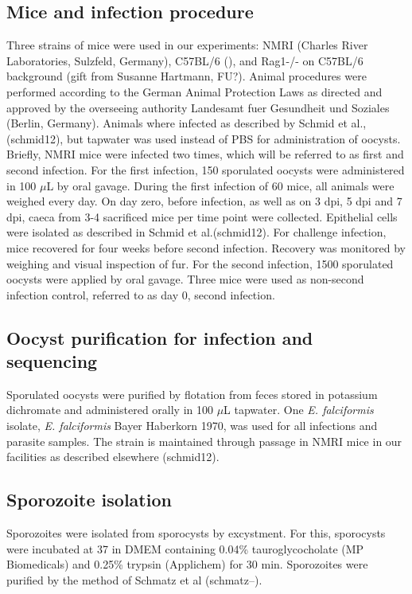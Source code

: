 \documentclass{bmcart}
\begin{document}
\subsection{Mice and infection procedure}
Three strains of mice were used in our experiments: NMRI (Charles
River Laboratories, Sulzfeld, Germany), C57BL/6 (), and Rag1-/- on
C57BL/6 background (gift from Susanne Hartmann, FU?).  Animal
procedures were performed according to the German Animal Protection
Laws as directed and approved by the overseeing authority Landesamt
fuer Gesundheit und Soziales (Berlin, Germany). Animals where infected
as described by Schmid et al., (schmid12), but tapwater was used
instead of PBS for administration of oocysts. Briefly, NMRI mice were
infected two times, which will be referred to as first and second
infection. For the first infection, 150 sporulated oocysts were
administered in 100 $\mu$L by oral gavage. During the first infection of
60 mice, all animals were weighed every day. On day zero, before
infection, as well as on 3 dpi, 5 dpi and 7 dpi, caeca from 3-4 sacrificed mice per time point were
collected. Epithelial cells were isolated as described in Schmid et
al.(schmid12). For challenge infection, mice recovered for four weeks
before second infection.  Recovery was monitored by weighing and
visual inspection of fur. For the second infection, 1500 sporulated
oocysts were applied by oral gavage. Three mice were used as
non-second infection control, referred to as day 0, second infection.

\subsection{Oocyst purification for infection and sequencing}
Sporulated oocysts were purified by flotation from feces stored in
potassium dichromate and administered orally in 100 $\mu$L tapwater. One
\textit{E. falciformis} isolate, \textit{E. falciformis} Bayer
Haberkorn 1970, was used for all infections and parasite samples. The
strain is maintained through passage in NMRI mice in our facilities as
described elsewhere (schmid12).

\subsection{Sporozoite isolation}
Sporozoites were isolated from sporocysts by excystment. For this,
sporocysts were incubated at 37\newcommand{\degree}C in DMEM containing 0.04\%
tauroglycocholate (MP Biomedicals) and 0.25\% trypsin (Applichem) for
30 min. Sporozoites were purified by the method of Schmatz et al
(schmatz--).
\end{document}
